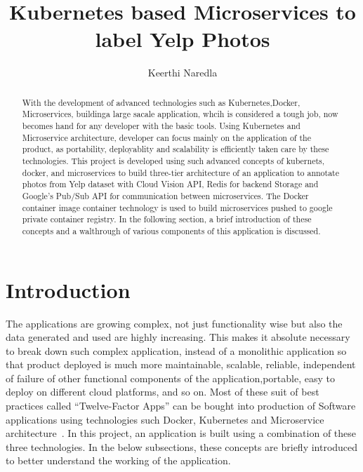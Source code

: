 
\title{Kubernetes based Microservices to label Yelp Photos}


\author{Keerthi Naredla}



\renewcommand{\shortauthors}{Keerthi}



\begin{abstract}
  With the development of advanced technologies such as
  Kubernetes,Docker, Microservices, buildinga large sacale
  application, whcih is considered a tough job, now becomes hand for
  any developer with the basic tools. Using Kubernetes and
  Microservice architecture, developer can focus mainly on the
  application of the product, as portability, deployablity and
  scalability is efficiently taken care by these technologies. This
  project is developed using such advanced concepts of kubernets,
  docker, and microservices to build three-tier architecture of an
  application to annotate photos from Yelp dataset with Cloud Vision
  API, Redis for backend Storage and Google’s Pub/Sub API for
  communication between microservices. The Docker container image
  container technology is used to build microservices pushed to google
  private container registry. In the following section, a brief
  introduction of these concepts and a walthrough of various
  components of this application is discussed.
\end{abstract}



\maketitle

\section{Introduction}

The applications are growing complex, not just functionality wise but
also the data generated and used are highly increasing. This makes it
absolute necessary to break down such complex application, instead of
a monolithic application so that product deployed is much more
maintainable, scalable, reliable, independent of failure of other
functional components of the application,portable, easy to deploy on
different cloud platforms, and so on. Most of these suit of best
practices called “Twelve-Factor Apps” can be bought into production of
Software applications using technologies such Docker, Kubernetes and
Microservice architecture~\cite{hid-sp18-602-twelve-factor}. In this
project, an application is built using a combination of these
three technologies. In the below subsections, these concepts are
briefly introduced to better understand the working of the
application.


